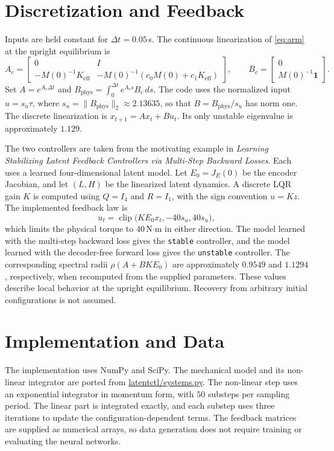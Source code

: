 \documentclass[10pt]{article}
\begin{document}
\section{Discretization and Feedback}

Inputs are held constant for $\Delta t=0.05$\,s.
The continuous linearization of \eqref{eq:arm} at the upright equilibrium is
\[
 A_c=\begin{bmatrix}
 0&I\\-M(0)^{-1}K_{\mathrm{eff}}&
 -M(0)^{-1}(c_0M(0)+c_1K_{\mathrm{eff}})
 \end{bmatrix},
 \qquad
 B_c=\begin{bmatrix}0\\M(0)^{-1}\bm 1\end{bmatrix}.
\]
Set $A=e^{A_c\Delta t}$ and
$B_{\mathrm{phys}}=\int_0^{\Delta t}e^{A_cs}B_c\,ds$.
The code uses the normalized input $u=s_u\tau$, where
$s_u=\|B_{\mathrm{phys}}\|_2\approx2.13635$, so that
$B=B_{\mathrm{phys}}/s_u$ has norm one.
The discrete linearization is $x_{t+1}=Ax_t+Bu_t$.
Its only unstable eigenvalue is approximately $1.129$.

The two controllers are taken from the motivating example in
\emph{Learning Stabilizing Latent Feedback Controllers via Multi-Step
Backward Losses}. Each uses a learned four-dimensional latent model.
Let $E_0=J_E(0)$ be the encoder Jacobian, and let $(L,H)$ be the
linearized latent dynamics. A discrete LQR gain $K$ is computed using
$Q=I_4$ and $R=I_1$, with the sign convention $u=Kz$.
The implemented feedback law is
\[
 u_t=\operatorname{clip}\bigl(KE_0x_t,-40s_u,40s_u\bigr),
\]
which limits the physical torque to $40$\,N$\cdot$m in either direction.
The model learned with the multi-step backward loss gives the
\texttt{stable} controller, and the model learned with the decoder-free
forward loss gives the \texttt{unstable} controller.
The corresponding spectral radii $\rho(A+BKE_0)$ are approximately
$0.9549$ and $1.1294$, respectively, when recomputed from the supplied
parameters. These values describe local behavior at the upright
equilibrium. Recovery from arbitrary initial configurations is not assumed.

\section{Implementation and Data}

The implementation uses NumPy and SciPy. The mechanical model and its
non-linear integrator are ported from \href{https://github.com/paullutkus/Learning-Stabilizing-Latent-Feedback-Controllers}{latentctl/systems.py}. 
The non-linear step uses an exponential integrator in
momentum form, with $50$ substeps per sampling period. The linear part is
integrated exactly, and each substep uses three iterations to update the
configuration-dependent terms. The feedback matrices are supplied as
numerical arrays, so data generation does not require training or
evaluating the neural networks.
\end{document}
